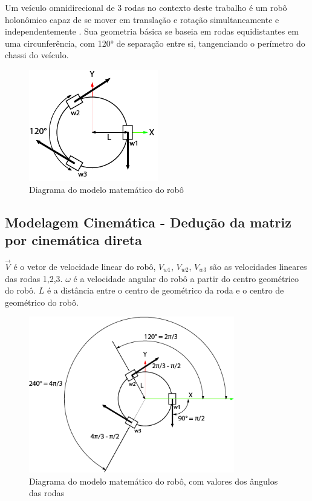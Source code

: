 
Um veículo omnidirecional de 3 rodas no contexto deste trabalho é um robô
holonômico capaz de se mover em translação e rotação simultaneamente e
independentemente \cite{mobile_manipulator_robot}. Sua geometria básica se 
baseia em rodas equidistantes em uma circunferência, com 120° de separação entre
 si, tangenciando o perímetro do chassi do veículo.

\begin{figure}[h]
	\centering
	\includegraphics{figures/model}
	\caption{Diagrama do modelo matemático do robô}
\end{figure}


\subsection{Modelagem Cinemática - Dedução da matriz por cinemática direta}

$\overrightarrow{V}$ é o vetor de velocidade linear do robô, $V_{w1}$, $V_{w2}$,
$V_{w3}$ são as velocidades lineares das rodas 1,2,3. 
$\omega $ é a velocidade angular do robô a partir do centro geométrico do robô.
$L$ é a distância entre o centro de geométrico da roda e o centro de geométrico
do robô.


\begin{figure}[h]
	\centering
	\includegraphics[width=0.8\textwidth]{figures/digram_model_dedution}
	\caption{Diagrama do modelo matemático do robô, com valores dos ângulos das rodas}
\end{figure}

